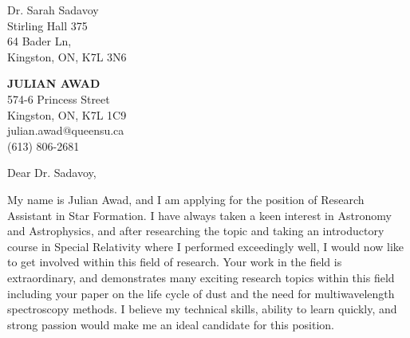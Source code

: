 \documentclass[11pt]{letter} %
\begin{document}
\begin{letter}{Dr. Sarah Sadavoy \\
Stirling Hall 375 \\
64 Bader Ln, \\
Kingston, ON, K7L 3N6}

\begin{center}
\textbf{\huge JULIAN AWAD} \\ %
\vspace{1em} %
574-6 Princess Street \\ Kingston, ON, K7L 1C9 \\ julian.awad@queensu.ca \\ (613) 806-2681 %
\end{center}
\hspace{2em}
\signature{Julian Awad} %
\vspace{-0.3in}
\opening{Dear Dr. Sadavoy,}

My name is Julian Awad, and I am applying for the position of Research Assistant in Star Formation. I have always taken a keen interest in Astronomy and Astrophysics, and after researching the topic and taking an introductory course in Special Relativity where I performed exceedingly well, I would now like to get involved within this field of research. Your work in the field is extraordinary, and demonstrates many exciting research topics within this field including your paper on the life cycle of dust and the need for multiwavelength spectroscopy methods. I believe my technical skills, ability to learn quickly, and strong passion would make me an ideal candidate for this position.


\end{letter}
\end{document}
